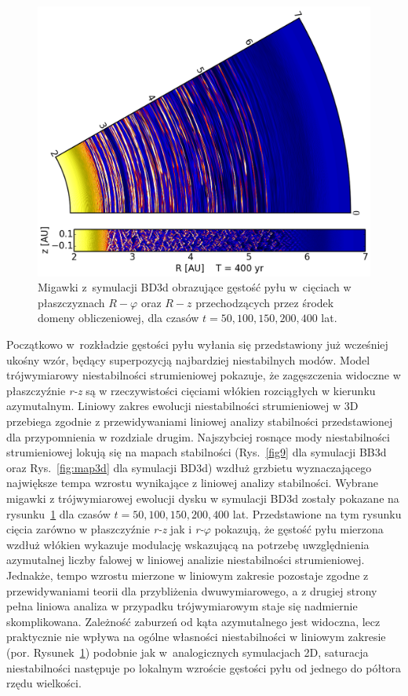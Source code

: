 \begin{figure}
   \includegraphics[width=0.44\linewidth]{figures/slice_nosg_05}
   \caption{
      Migawki z~symulacji BD3d obrazujące gęstość pyłu w~cięciach w
      płaszczyznach $R -\varphi$ oraz $R - z$ przechodzących przez środek 
   domeny obliczeniowej, dla czasów $t= 50, 100, 150, 200, 400$ lat.}
   \label{fig:slicenosg}
\end{figure}
%
Początkowo w~rozkładzie gęstości pyłu wyłania się przedstawiony już wcześniej
ukośny wzór, będący superpozycją najbardziej niestabilnych modów.  Model
trójwymiarowy niestabilności strumieniowej pokazuje, że zagęszczenia widoczne w
płaszczyźnie \textit{r-z} są w rzeczywistości cięciami włókien rozciągłych w
kierunku azymutalnym. Liniowy zakres ewolucji niestabilności strumieniowej w 3D
przebiega zgodnie z przewidywaniami liniowej analizy stabilności przedstawionej
dla przypomnienia w rozdziale drugim. Najszybciej rosnące mody niestabilności
strumieniowej lokują się na mapach stabilności (Rys.~\ref{fig9} dla symulacji
BB3d oraz Rys.~\ref{fig:map3d} dla symulacji BD3d) wzdłuż grzbietu
wyznaczającego największe tempa wzrostu wynikające z liniowej
analizy stabilności. Wybrane migawki z trójwymiarowej ewolucji dysku w symulacji
BD3d zostały pokazane na rysunku~\ref{fig:slicenosg} dla czasów $t =  50, 100,
150, 200, 400$ lat. Przedstawione na tym rysunku cięcia zarówno w płaszczyźnie
\textit{r-z} jak i \textit{r-}$\varphi$ pokazują, że gęstość pyłu mierzona
wzdłuż włókien wykazuje modulację wskazującą na potrzebę uwzględnienia
azymutalnej liczby falowej w liniowej analizie niestabilności strumieniowej.
Jednakże, tempo wzrostu mierzone w liniowym zakresie pozostaje zgodne z
przewidywaniami teorii dla przybliżenia dwuwymiarowego, a z drugiej strony pełna
liniowa analiza w przypadku trójwymiarowym staje się nadmiernie skomplikowana.
Zależność zaburzeń od kąta azymutalnego jest widoczna, lecz praktycznie nie
wpływa na ogólne własności niestabilności w liniowym zakresie (por.
Rysunek~\ref{fig:slicenosg}) podobnie jak w~analogicznych symulacjach 2D,
saturacja niestabilności następuje po lokalnym wzroście gęstości pyłu od jednego
do półtora rzędu wielkości.


